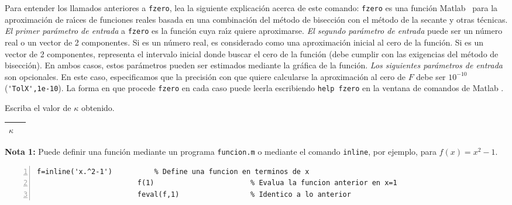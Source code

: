 \documentclass[letter,11pt]{article}
\newcommand\0{\mathbf{0}}
\newcommand{\matlab}{{\sc Matlab} }
\begin{document}
\begin{enumerate}
\begin{enumerate}
						Para entender los llamados anteriores a \verb+fzero+,
						lea la siguiente explicaci\'on acerca
						de este comando: \verb+fzero+ es una funci\'on \matlab\, para la aproxi\-ma\-ci\'on
						de ra\'{\i}ces de funciones reales basada en una combinaci\'on del
						m\'etodo de bisecci\'on con el m\'etodo de la secante y otras t\'ecnicas.
						{\em El primer par\'ametro
						de entrada} a \verb+fzero+ es la funci\'on cuya ra\'{\i}z quiere aproximarse.
						{\em El segundo par\'ametro de entrada} puede ser un n\'umero real
						o un vector de 2 componentes. Si es un n\'umero real, es considerado
						como una aproximaci\'on inicial al cero de la funci\'on. Si es un vector
						de 2 componentes, representa el intervalo inicial donde buscar el cero
						de la funci\'on (debe cumplir con las exigencias del m\'etodo de bisecci\'on). En ambos casos, estos par\'ametros pueden ser estimados mediante la gr\'afica de la funci\'on.
						{\em Los siguientes pa\-r\'a\-me\-tros de entrada} son opcionales. En este caso, especificamos
						que la precisi\'on con que quiere calcularse la aproximaci\'on al cero de $F$ debe
						ser $10^{-10}$ (\verb+'TolX',1e-10+). La forma en que
						procede \verb+fzero+ en cada caso puede leerla escribiendo
						\verb+help fzero+ en la ventana de comandos de \matlab.
						
						\medskip

						Escriba el valor de $\kappa$ obtenido.

						\medskip

						\def\arraystretch{1.5}
						\begin{center}
							\begin{tabular}{|p{.8in}|p{4in}|}
								\hline $\kappa$ & \\
								\hline
						\end{tabular}\end{center}
						\medskip

\textbf{Nota 1:} Puede definir una funci\'on mediante un programa \verb"funcion.m" o mediante el comando \verb"inline", por ejemplo, para $f(x)=x^2-1$.

						\medskip
							
						\begin{Verbatim}[gobble=6,frame=single,numbers=left]
						f=inline('x.^2-1')          % Define una funcion en terminos de x 
						f(1)                       % Evalua la funcion anterior en x=1
						feval(f,1)                 % Identico a lo anterior
						\end{Verbatim}
						

\end{enumerate}
\end{enumerate}
\end{document}

